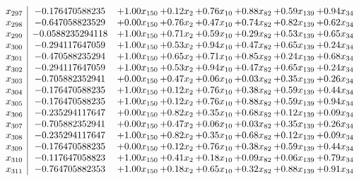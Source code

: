 \documentclass[8pt]{article}
\begin{document}
\[\begin{array}{c| c c@{\hskip 2pt} c@{\hskip 2pt} c@{\hskip 2pt} c@{\hskip 2pt} c@{\hskip 2pt} c@{\hskip 2pt} }
 x_{297}   &  -0.176470588235 & +  1.00 x_{150} & +  0.12 x_{2} & +  0.76 x_{10} & +  0.88 x_{82} & +  0.59 x_{139} & +  0.94 x_{34}\\
 x_{298}   &  -0.647058823529 & +  0.00 x_{150} & +  0.76 x_{2} & +  0.47 x_{10} & +  0.74 x_{82} & +  0.82 x_{139} & +  0.62 x_{34}\\
 x_{299}   &  -0.0588235294118 & +  1.00 x_{150} & +  0.71 x_{2} & +  0.59 x_{10} & +  0.29 x_{82} & +  0.53 x_{139} & +  0.65 x_{34}\\
 x_{300}   &  -0.294117647059 & +  1.00 x_{150} & +  0.53 x_{2} & +  0.94 x_{10} & +  0.47 x_{82} & +  0.65 x_{139} & +  0.24 x_{34}\\
 x_{301}   &  -0.470588235294 & +  1.00 x_{150} & +  0.65 x_{2} & +  0.71 x_{10} & +  0.85 x_{82} & +  0.24 x_{139} & +  0.68 x_{34}\\
 x_{302}   &  -0.294117647059 & +  1.00 x_{150} & +  0.53 x_{2} & +  0.94 x_{10} & +  0.47 x_{82} & +  0.65 x_{139} & +  0.24 x_{34}\\
 x_{303}   &  -0.705882352941 & +  0.00 x_{150} & +  0.47 x_{2} & +  0.06 x_{10} & +  0.03 x_{82} & +  0.35 x_{139} & +  0.26 x_{34}\\
 x_{304}   &  -0.176470588235 & +  1.00 x_{150} & +  0.12 x_{2} & +  0.76 x_{10} & +  0.38 x_{82} & +  0.59 x_{139} & +  0.44 x_{34}\\
 x_{305}   &  -0.176470588235 & +  1.00 x_{150} & +  0.12 x_{2} & +  0.76 x_{10} & +  0.88 x_{82} & +  0.59 x_{139} & +  0.94 x_{34}\\
 x_{306}   &  -0.235294117647 & +  0.00 x_{150} & +  0.82 x_{2} & +  0.35 x_{10} & +  0.68 x_{82} & +  0.12 x_{139} & +  0.09 x_{34}\\
 x_{307}   &  -0.705882352941 & +  0.00 x_{150} & +  0.47 x_{2} & +  0.06 x_{10} & +  0.03 x_{82} & +  0.35 x_{139} & +  0.26 x_{34}\\
 x_{308}   &  -0.235294117647 & +  1.00 x_{150} & +  0.82 x_{2} & +  0.35 x_{10} & +  0.68 x_{82} & +  0.12 x_{139} & +  0.09 x_{34}\\
 x_{309}   &  -0.176470588235 & +  0.00 x_{150} & +  0.12 x_{2} & +  0.76 x_{10} & +  0.38 x_{82} & +  0.59 x_{139} & +  0.44 x_{34}\\
 x_{310}   &  -0.117647058823 & +  1.00 x_{150} & +  0.41 x_{2} & +  0.18 x_{10} & +  0.09 x_{82} & +  0.06 x_{139} & +  0.79 x_{34}\\
 x_{311}   &  -0.764705882353 & +  1.00 x_{150} & +  0.18 x_{2} & +  0.65 x_{10} & +  0.32 x_{82} & +  0.88 x_{139} & +  0.91 x_{34}\\

\end{array}\]
\end{document}
